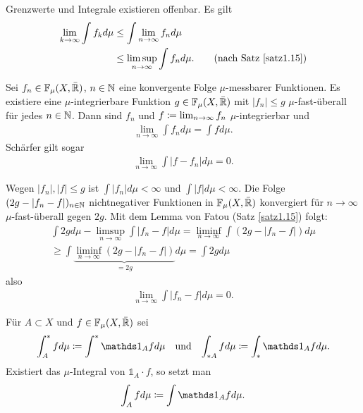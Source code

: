 \documentclass[a4paper,twoside,DIV15,BCOR12mm]{scrbook}
\newcommand{\ind}{\mathds 1}
\begin{document}
\begin{beweis}
Grenzwerte und Integrale existieren offenbar. Es gilt 
\begin{align*}
\lim_{k\to\infty}\int f_k d\mu 
&\le \int \lim_{n\to\infty} f_n d\mu \\
&\le \limsup_{n\to\infty} \int f_n d\mu. \tag{nach Satz \ref{satz1.15}}
\end{align*}
\end{beweis}

\begin{satz}[Lebesgue]
\label{satz1.17}
Sei $f_n\in\mathbb F_\mu(X,\bar{\mathbb{R}})$, $n\in\mathbb{N}$ eine konvergente Folge $\mu$-messbarer Funktionen. Es existiere eine $\mu$-integrierbare Funktion $g\in\mathbb F_\mu(X,\bar{\mathbb{R}})$ mit $|f_n|\le g$ $\mu$-fast-überall für jedes $n\in\mathbb{N}$. Dann sind $f_n$ und $f\da \lim_{n\to\infty} f_n$ $\mu$-integrierbar und 
\begin{align*}
\lim_{n\to\infty} \int f_n d\mu = \int f d\mu.
\end{align*}
Schärfer gilt sogar
\begin{align*}
\lim_{n\to\infty} \int |f-f_n| d\mu = 0.
\end{align*}
\end{satz}

\begin{beweis}
Wegen $|f_n|,|f| \le g$ ist $\int |f_n| d\mu <\infty$ und $\int |f|d\mu <\infty$. Die Folge $(2g-|f_n-f|)_{n\in\mathbb{N}}$ nichtnegativer Funktionen in $\mathbb F_\mu(X,\bar{\mathbb{R}})$ konvergiert für $n\to\infty$ $\mu$-fast-überall gegen $2g$. Mit dem Lemma von Fatou (Satz \ref{satz1.15}) folgt:
\begin{multline*}
\int 2g d\mu - \limsup_{n\to\infty} \int |f_n -f|d\mu
= \liminf_{n\to\infty} \int (2g - |f_n -f|) d\mu \\
\ge \int \underbrace{\liminf_{n\to\infty}(2g - |f_n -f|)}_{=2g} d\mu = \int 2gd\mu
\end{multline*}
also 
\begin{align*}
\lim_{n\to\infty} \int |f_n -f| d\mu = 0.
\end{align*}
\end{beweis}

\begin{notation}
Für $A\subset X$ und $f\in\mathbb F_\mu (X,\bar{\mathbb{R}})$ sei
\begin{align*}
\int^*_A fd\mu \da \int^* \ind_{A}f d\mu && \text{und} &&
\int_{*A} fd\mu \da \int_* \ind_{A}f d\mu.
\end{align*}
Existiert das $\mu$-Integral von $\ind_A \cdot f$, so setzt man
\begin{align*}
\int_A f d\mu \da \int \ind_A fd\mu.
\end{align*}
\end{notation}
\end{document}

